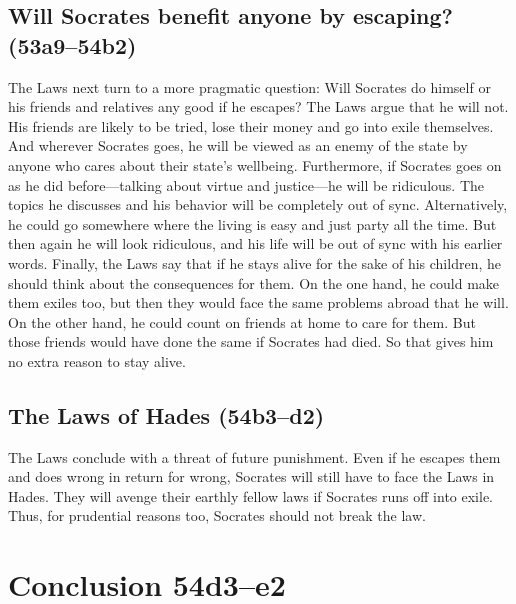\documentclass[12pt,letterpaper]{article}
\begin{document}

\subsection*{Will Socrates benefit anyone by escaping? (53a9--54b2)}

The Laws next turn to a more pragmatic question: Will Socrates do himself or his friends and relatives any good if he escapes?  The Laws argue that he will not. His friends are likely to be tried, lose their money and go into exile themselves. And wherever Socrates goes, he will be viewed as an enemy of the state by anyone who cares about their state's wellbeing. Furthermore, if Socrates goes on as he did before---talking about virtue and justice---he will be ridiculous. The topics he discusses and his behavior will be completely out of sync. Alternatively, he could go somewhere where the living is easy and just party all the time. But then again he will look ridiculous, and his life will be out of sync with his earlier words. Finally, the Laws say that if he stays alive for the sake of his children, he should think about the consequences for them. On the one hand, he could make them exiles too, but then they would face the same problems abroad that he will. On the other hand, he could count on friends at home to care for them. But those friends would have done the same if Socrates had died. So that gives him no extra reason to stay alive.

\subsection*{The Laws of Hades (54b3--d2)}

The Laws conclude with a threat of future punishment. Even if he escapes them and does wrong in return for wrong, Socrates will still have to face the Laws in Hades. They will avenge their earthly fellow laws if Socrates runs off into exile. Thus, for prudential reasons too, Socrates should not break the law.


\section*{Conclusion 54d3--e2}
\end{document}
